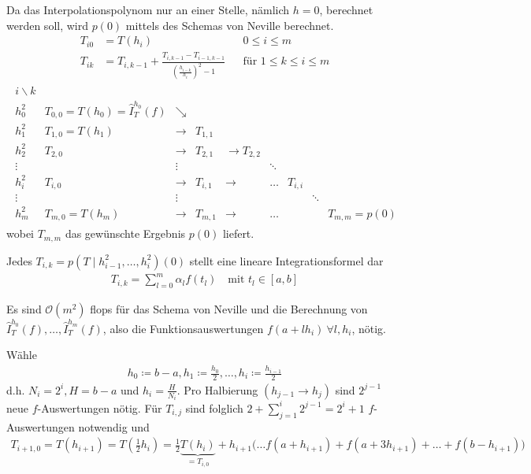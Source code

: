 \documentclass[ngerman,fontsize=11pt, paper=a4, parskip=half, titlepage=true, toc=bib]{scrbook}
\begin{document}
Da das Interpolationspolynom nur an einer Stelle,
nämlich $h=0$, berechnet werden soll,
wird $p(0)$ mittels des Schemas von Neville berechnet.
\begin{align}\nonumber
  T_{i0} &= T(h_i) &&0\leq i\leq m \\
  T_{ik} &= T_{i,k-1} 
           + \frac{T_{i,k-1}-T_{i-1,k-1}}
           {\left(\frac{h_{i-k}}{h_i}\right)^2-1} 
                   &&\text{für } 1\leq k\leq i\leq m
                      \label{VII.3.6}
\end{align}
\begin{align*}
  \begin{array}{clccccccl}
    i\backslash k \\
    h_0^2 & T_{0,0}=T(h_0)=\hat{I}_T^{h_0}(f) & \searrow \\
    h_1^2 & T_{1,0}=T(h_1) & \longrightarrow & T_{1,1}\\
    h_2^2 & T_{2,0}& \longrightarrow &T_{2,1} & \longrightarrow T_{2,2} \\
    \vdots&&\vdots&&& \ddots\\
    h_i^2 & T_{i,0} & \longrightarrow & T_{i,1} & \longrightarrow & \ldots &
                                                                             T_{i,i}\\
    \vdots&&\vdots&&&&& \ddots\\
    h_m^2 & T_{m,0}=T(h_m)&\longrightarrow & T_{m,1} &\longrightarrow &\ldots&&&T_{m,m}=p(0)
  \end{array}
\end{align*}
wobei $T_{m,m}$ das gewünschte Ergebnis $p(0)$ liefert.

\begin{Beme}\label{7.3.3}
  Jedes $T_{i,k}=p(T\mid h_{i-1}^2,\ldots, h_i^2)(0)$ 
  stellt eine lineare Integrationsformel dar
  \begin{gather*}
    T_{i,k}=\sum_{l=0}^m \alpha_lf(t_l)
    \quad \text{mit } t_l\in[a,b]
  \end{gather*}
\end{Beme}

Es sind $\mathcal{O}(m^2)$ flops für das Schema von Neville
und die Berechnung von 
$\hat{I}_T^{h_0}(f),\ldots, \hat{I}_T^{h_m}(f)$,
also die Funktionsauswertungen $f(a+lh_i)~\forall l,h_i$,
nötig.

Wähle 
\begin{gather}
  h_0\coloneqq b-a, 
  h_1\coloneqq \frac{h_0}{2}, \ldots, 
  h_i\coloneqq \frac{h_{i-1}}{2}
  \label{VII.3.7}
\end{gather}
d.h. $N_i=2^i, H=b-a$ und $h_i=\frac{H}{N_i}$.
Pro Halbierung $(h_{j-1}\rightarrow h_j)$ sind $2^{j-1}$
neue $f$-Auswertungen nötig.
Für $T_{i,j}$ sind folglich $2+\sum_{j=1}^i2^{j-1}=2^i+1$
$f$-Auswertungen notwendig und
\begin{gather}
  T_{i+1,0}=T(h_{i+1})=T\left(\frac{1}{2}h_i\right)
  =\frac{1}{2}\underbrace{T(h_i)}_{=T_{i,0}}
  + h_{i+1}\big(\ldots f(a+h_{i+1})+f(a+3h_{i+1})+\ldots
  + f(b-h_{i+1})\big)
  \label{VII.3.8}
\end{gather}
\end{document}
